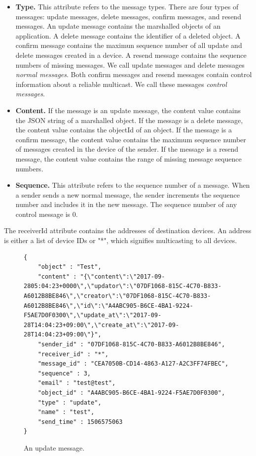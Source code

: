 \documentclass[a4paper,11pt]{report}
\begin{document}
\begin{itemize}[leftmargin=7mm]
	\setlength{\itemsep}{1pt}
	\setlength{\parskip}{0pt}
	\setlength{\parsep}{0pt}
	\item \textbf{Type.}
	This attribute refers to the message types.
	There are four types of messages: update messages, delete messages, confirm messages, and resend messages.
	An update message contains the marshalled objects of an application.
	A delete message contains the identifier of a deleted object.
	A confirm message contains the maximun sequence number of all update and delete messages created in a device.
	A resend message contains the sequence numbers of missing messages.
	We call update messages and delete messages \emph{normal messages}. 
	Both confirm messages and resend messages contain control information about a reliable multicast. 
	We call these messages \emph{control messages}.
	\item \textbf{Content.} 
	If the message is an update message, the content value contains the JSON string of a marshalled object.
	If the message is a delete message, the content value contains the objectId of an object.
	If the message is a confirm message, the content value contains the maximum sequence number of messages created in the device of the sender.
	If the message is a resend message, the content value contains the range of missing message sequence numbers.
	\item \textbf{Sequence.}
	This attribute refers to the sequence number of a message.
	When a sender sends a new normal message, the sender increments the sequence number and includes it in the new message.
	The sequence number of any control message is 0.
\end{itemize}

The receiverId attribute contains the addresses of destination devices.
An address is either a list of device IDs or "*", which signifies multicasting to all devices.

\begin{figure}
\caption{An update message.}
\label{fig:grouper_message}
\begin{lstlisting}[frame=none language=JSON] 
{
    "object" : "Test",
    "content" : "{\"content\":\"2017-09-2805:04:23+0000\",\"updator\":\"07DF1068-815C-4C70-B833-A6012B8BE846\",\"creator\":\"07DF1068-815C-4C70-B833-A6012B8BE846\",\"id\":\"A4ABC905-B6CE-4BA1-9224-F5AE7D0F0300\",\"update_at\":\"2017-09-28T14:04:23+09:00\",\"create_at\":\"2017-09-28T14:04:23+09:00\"}",
    "sender_id" : "07DF1068-815C-4C70-B833-A6012B8BE846",
    "receiver_id" : "*",
    "message_id" : "CEA7050B-CD14-4863-A127-A2C3FF74FBEC",
    "sequence" : 3,
    "email" : "test@test",
    "object_id" : "A4ABC905-B6CE-4BA1-9224-F5AE7D0F0300",
    "type" : "update",
    "name" : "test",
    "send_time" : 1506575063
}		
\end{lstlisting}
\end{figure}
\end{document}
